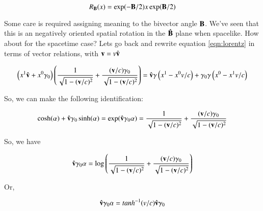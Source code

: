 \documentclass{article}      %
\newcommand{\Bcap}[0]{\hat{\BB}}
\begin{document}
\begin{equation}
R_{\mathbf{B}}(x) = \exp(-\mathbf{B}/2) x \exp(\mathbf{B}/2)
\end{equation}

Some care is required assigning meaning to the bivector angle $\mathbf{B}$.  We've seen that this is an negatively oriented spatial rotation in the $
\Bcap$ plane when spacelike.  How about for the spacetime case?
Lets go back and rewrite equation \ref{eqn:lorentz} in terms of vector
relations, with $\mathbf{v} = v \hat{\mathbf{v}}$

\begin{equation}
\left( x^1 \hat{\mathbf{v}} + x^0 \gamma_0 \right) 
\left(
\frac{1}{\sqrt{1 -(\mathbf{v}/c)^2}} + \frac{(\mathbf{v}/c) \gamma_0}{\sqrt{1 -(\mathbf{v}/c)^2}}
\right)
=
\hat{\mathbf{v}} \gamma 
\left( x^1 - x^0 v/c \right)
+
\gamma_0 \gamma
\left( x^0 - x^1 v/c \right)
\end{equation}

So, we can make the following identification:

\begin{equation*}
\cosh(\alpha) + \hat{\mathbf{v}} \gamma_0 \sinh(\alpha) = \exp( \hat{\mathbf{v}} \gamma_0 \alpha)
=
\frac{1}{\sqrt{1 -(\mathbf{v}/c)^2}} + \frac{(\mathbf{v}/c) \gamma_0}{\sqrt{1 -(\mathbf{v}/c)^2}}
\end{equation*}

So, we have

\begin{equation*}
\hat{\mathbf{v}} \gamma_0 \alpha = \log\left( 
\frac{1}{\sqrt{1 -(\mathbf{v}/c)^2}} + \frac{(\mathbf{v}/c) \gamma_0}{\sqrt{1 -(\mathbf{v}/c)^2}} \right)
\end{equation*}

Or,

\begin{equation*}
\hat{\mathbf{v}} \gamma_0 \alpha = tanh^{-1}(v/c) \hat{\mathbf{v}} \gamma_0
\end{equation*}
\end{document}
